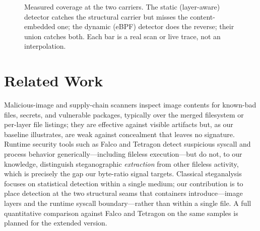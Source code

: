 \documentclass[sigconf,nonacm]{acmart}
\begin{document}
\begin{figure}[t]
\centering
{}
\caption{Measured coverage at the two carriers. The static (layer-aware) detector
catches the structural carrier but misses the content-embedded one; the dynamic
(eBPF) detector does the reverse; their union catches both. Each bar is a real
scan or live trace, not an interpolation.}
\label{fig:crossover}
\end{figure}

\section{Related Work}
Malicious-image and supply-chain scanners inspect image contents for known-bad
files, secrets, and vulnerable packages, typically over the merged filesystem or
per-layer file listings; they are effective against visible artifacts but, as our
baseline illustrates, are weak against concealment that leaves no signature.
Runtime security tools such as Falco and Tetragon detect suspicious syscall and
process behavior generically---including fileless execution---but do not, to our
knowledge, distinguish steganographic \emph{extraction} from other fileless
activity, which is precisely the gap our byte-ratio signal targets. Classical
steganalysis focuses on statistical detection within a single medium; our
contribution is to place detection at the two structural seams that containers
introduce---image layers and the runtime syscall boundary---rather than within a
single file. A full quantitative comparison against Falco and Tetragon on the same
samples is planned for the extended version.
\end{document}
